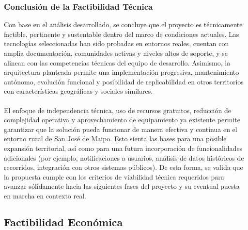 \documentclass[12pt]{article}
\begin{document}
\subsubsection{Conclusión de la Factibilidad Técnica}
Con base en el análisis desarrollado, se concluye que el proyecto es técnicamente factible, pertinente y sustentable dentro del marco de condiciones actuales. Las tecnologías seleccionadas han sido probadas en entornos reales, cuentan con amplia documentación, comunidades activas y niveles altos de soporte, y se alinean con las competencias técnicas del equipo de desarrollo. Asimismo, la arquitectura planteada permite una implementación progresiva, mantenimiento autónomo, evolución funcional y posibilidad de replicabilidad en otros territorios con características geográficas y sociales similares. 
\\\\
El enfoque de independencia técnica, uso de recursos gratuitos, reducción de complejidad operativa y aprovechamiento de equipamiento ya existente permite garantizar que la solución pueda funcionar de manera efectiva y continua en el entorno rural de San José de Maipo. Esto sienta las bases para una posible expansión territorial, así como para una futura incorporación de funcionalidades adicionales (por ejemplo, notificaciones a usuarios, análisis de datos históricos de recorridos, integración con otros sistemas públicos). De esta forma, se valida que la propuesta cumple con los criterios de viabilidad técnica requeridos para avanzar sólidamente hacia las siguientes fases del proyecto y su eventual puesta en marcha en contexto real. 
\newpage
\subsection{Factibilidad Económica}
\end{document}
